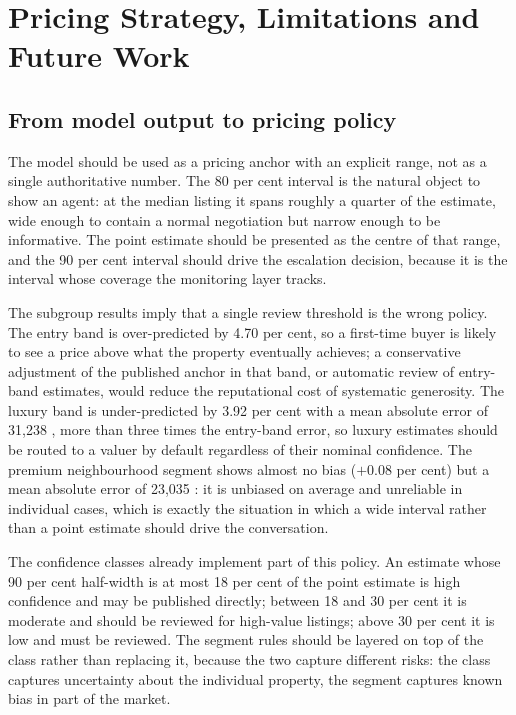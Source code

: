 \section{Pricing Strategy, Limitations and Future Work}
\label{sec:recommendations}

\subsection{From model output to pricing policy}

The model should be used as a pricing anchor with an explicit range, not as a single
authoritative number. The 80 per cent interval is the natural object to show an
agent: at the median listing it spans roughly a quarter of the estimate, wide enough
to contain a normal negotiation but narrow enough to be informative. The point
estimate should be presented as the centre of that range, and the 90 per cent interval
should drive the escalation decision, because it is the interval whose coverage the
monitoring layer tracks.

The subgroup results imply that a single review threshold is the wrong policy. The
entry band is over-predicted by 4.70 per cent, so a first-time buyer is likely to see
a price above what the property eventually achieves; a conservative adjustment of the
published anchor in that band, or automatic review of entry-band estimates, would
reduce the reputational cost of systematic generosity. The luxury band is
under-predicted by 3.92 per cent with a mean absolute error of 31,238 \USD, more than
three times the entry-band error, so luxury estimates should be routed to a valuer by
default regardless of their nominal confidence. The premium neighbourhood segment
shows almost no bias ($+0.08$ per cent) but a mean absolute error of 23,035 \USD: it
is unbiased on average and unreliable in individual cases, which is exactly the
situation in which a wide interval rather than a point estimate should drive the
conversation.

The confidence classes already implement part of this policy. An estimate whose 90
per cent half-width is at most 18 per cent of the point estimate is high confidence
and may be published directly; between 18 and 30 per cent it is moderate and should
be reviewed for high-value listings; above 30 per cent it is low and must be
reviewed. The segment rules should be layered on top of the class rather than
replacing it, because the two capture different risks: the class captures uncertainty
about the individual property, the segment captures known bias in part of the market.

